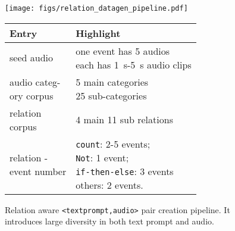 \begin{figure}[t]
    \centering
    \begin{minipage}{0.6\textwidth}
        \centering
        \texttt{[image: figs/relation\_datagen\_pipeline.pdf]}
        \caption{\small Relation aware \texttt{<textprompt,audio>} pair creation pipeline. It introduces large diversity in both text prompt and audio.}
        \label{fig:relation_datagen_pipeline}
    \end{minipage}\hfill
    \begin{minipage}{0.4\textwidth}
        \centering
        \scriptsize
        \begin{tabular}{p{1.3cm}<{\centering}|p{3cm}<{\centering}}
        \hline
        Entry & Highlight\\
        \hline
        seed audio & \makecell[c]{one event has 5 audios\\
                                  each has 1~s-5~s audio clips}\\
        \hline
        \makecell[c]{audio categ-\\ory corpus} & \makecell[c]{5 main categories\\25 sub-categories}\\
        \hline
        \makecell[c]{relation\\corpus} & 4 main 11 sub relations\\
        \hline
        \makecell[c]{relation -\\event number} & \makecell[c]{\texttt{count}: 2-5 events;\\
                                                               \texttt{Not}: 1 event;\\
                                                               \texttt{if-then-else}: 3 events\\
                                                               others: 2 events.}\\
                                                               

\end{tabular}
\end{minipage}
\end{figure}
